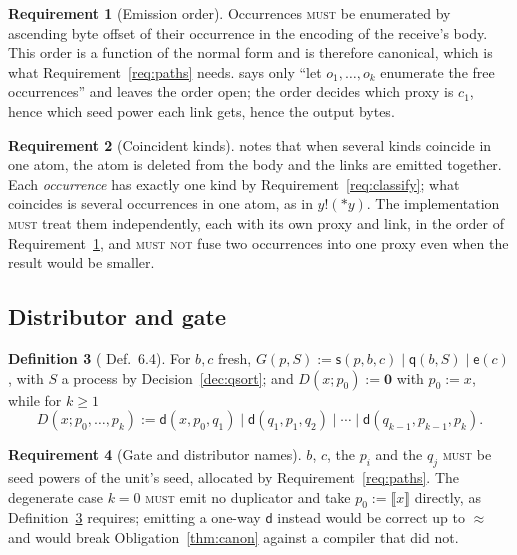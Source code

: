 \documentclass[11pt,a4paper]{article}
\newcommand{\MUST}{\textsc{must}}
\newcommand{\MUSTNOT}{\textsc{must not}}
\newcommand{\drp}[1]{{*}#1}
\newcommand{\out}[2]{#1!(#2)}
\newcommand{\nil}{\mathbf{0}}
\newcommand{\enc}[1]{\llbracket #1 \rrbracket}
\newcommand{\bisim}{\approx}
\newcommand{\dd}{\mathsf{d}}
\newcommand{\sy}{\mathsf{s}}
\newcommand{\ev}{\mathsf{e}}
\newcommand{\qq}{\mathsf{q}}
\theoremstyle{definition}
\newtheorem{definition}{Definition}[section]
\newtheorem{requirement}[definition]{Requirement}
\theoremstyle{plain}
\begin{document}
\begin{requirement}[Emission order]\label{req:occorder}
Occurrences \MUST{} be enumerated by ascending byte offset of their occurrence
in the encoding of the receive's body. This order is a function of the normal
form and is therefore canonical, which is what Requirement~\ref{req:paths}
needs. \cite[Def.~6.6]{draft3} says only ``let $o_{1},\dots,o_{k}$ enumerate
the free occurrences'' and leaves the order open; the order decides which
proxy is $c_{1}$, hence which seed power each link gets, hence the output
bytes.
\end{requirement}

\begin{requirement}[Coincident kinds]\label{req:coincide}
\cite[Table~1]{draft3} notes that when several kinds coincide in one atom, the
atom is deleted from the body and the links are emitted together. Each
\emph{occurrence} has exactly one kind by
Requirement~\ref{req:classify}; what coincides is several occurrences in one
atom, as in $\out{y}{\drp{y}}$. The implementation \MUST{} treat them
independently, each with its own proxy and link, in the order of
Requirement~\ref{req:occorder}, and \MUSTNOT{} fuse two occurrences into one
proxy even when the result would be smaller.
\end{requirement}

\subsection{Distributor and gate}

\begin{definition}[\cite{draft3} Def.~6.4]\label{def:gate}
For $b,c$ fresh, $G(p,S) := \sy(p,b,c) \mid \qq(b,S) \mid \ev(c)$, with $S$ a
process by Decision~\ref{dec:qsort}; and $D(x;p_{0}) := \nil$ with
$p_{0} := x$, while for $k \geq 1$
\[
  D(x;p_{0},\dots,p_{k}) := \dd(x,p_{0},q_{1}) \mid \dd(q_{1},p_{1},q_{2})
  \mid \cdots \mid \dd(q_{k-1},p_{k-1},p_{k}).
\]
\end{definition}

\begin{requirement}[Gate and distributor names]\label{req:gatenames}
$b$, $c$, the $p_{i}$ and the $q_{j}$ \MUST{} be seed powers of the unit's
seed, allocated by Requirement~\ref{req:paths}. The degenerate case $k = 0$
\MUST{} emit no duplicator and take $p_{0} := \enc{x}$ directly, as
Definition~\ref{def:gate} requires; emitting a one-way $\dd$ instead would be
correct up to $\bisim$ and would break Obligation~\ref{thm:canon} against a
compiler that did not.
\end{requirement}
\end{document}
